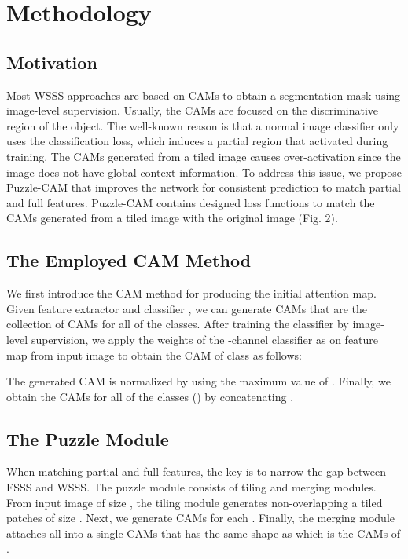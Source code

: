\documentclass{article}
\begin{document}
\section{Methodology}
\label{sec:methodology}



\subsection{Motivation}
\label{ssec:motivation}



Most WSSS approaches are based on CAMs to obtain a segmentation mask using image-level supervision. 
Usually, the CAMs are focused on the discriminative region of the object. The well-known reason is that a normal image classifier only uses the classification loss, which induces a partial region that activated during training.
The CAMs generated from a tiled image causes over-activation since the image does not have global-context information.
To address this issue, we propose Puzzle-CAM that improves the network for consistent prediction to match partial and full features.
Puzzle-CAM contains designed loss functions to match the CAMs generated from a tiled image with the original image (Fig. 2).

\subsection{The Employed CAM Method}
\label{ssec:cam}
We first introduce the CAM method for producing the initial attention map.
Given feature extractor  and classifier , we can generate CAMs  that are the collection of CAMs for all of the classes.
After training the classifier by image-level supervision, we apply the weights of the -channel classifier as  on feature map  from input image  to obtain the CAM of class  as follows: 



The generated CAM is normalized by using the maximum value of .
Finally, we obtain the CAMs for all of the classes () by concatenating . 

\subsection{The Puzzle Module}
\label{ssec:module}
When matching partial and full features, the key is to narrow the gap between FSSS and WSSS.
The puzzle module consists of tiling and merging modules.
From input image  of size , the tiling module generates non-overlapping a tiled patches  of size .
Next, we generate  CAMs for each .
Finally, the merging module attaches all  into a single CAMs  that has the same shape as  which is the CAMs of .
\end{document}
